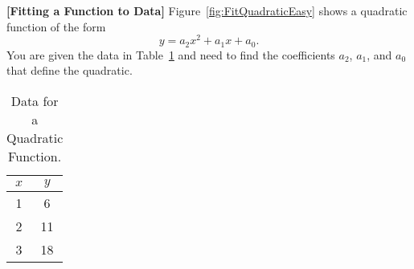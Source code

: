 \begin{example}
\label{ex:FittingEquations}
\textbf{[Fitting a Function to Data]} 
Figure~\ref{fig:FitQuadraticEasy} shows a quadratic function of the form 
\begin{equation}
    \label{eq:quadraticFromData}
    y = a_2 x^2 + a_1 x + a_0.
\end{equation}
You are given the data in Table~\ref{tab:QuadraticDataChap02} and need to find the coefficients $a_2$, $a_1$, and $a_0$ that define the quadratic.
\begin{table}[!hbt]
\caption[]{Data for a Quadratic Function.}
\label{tab:QuadraticDataChap02}
\begin{center}
\begin{tabular}{||c|c||}
\hline
 $x$ & $y$\\
\hline
1  &   6 \\
 2    &  11 \\
3   & 18 \\
\hline
\end{tabular}
\end{center}
\end{table}
\end{example}


